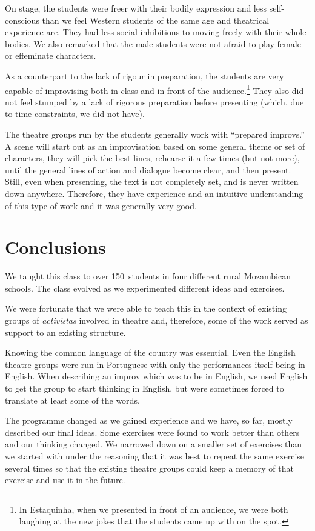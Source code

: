 \documentclass[article,twocolumn,twoside]{memoir}
\begin{document}
On stage, the students were freer with their bodily expression and less
self-conscious than we feel Western students of the same age and theatrical
experience are. They had less social inhibitions to moving freely with their
whole bodies. We also remarked that the male students were not afraid to play
female or effeminate characters.

As a counterpart to the lack of rigour in preparation, the students are very
capable of improvising both in class and in front of the audience.\footnote{In
Estaquinha, when we presented in front of an audience, we were both laughing at
the new jokes that the students came up with on the spot.} They also did not
feel stumped by a lack of rigorous preparation before presenting (which, due to
time constraints, we did not have).

The theatre groups run by the students generally work with ``prepared
improvs.'' A scene will start out as an improvisation based on some general
theme or set of characters, they will pick the best lines, rehearse it a few
times (but not more), until the general lines of action and dialogue become
clear, and then present. Still, even when presenting, the text is not
completely set, and is never written down anywhere. Therefore, they have
experience and an intuitive understanding of this type of work and it was
generally very good.

\chapter{Conclusions}

We taught this class to over 150~students in four different rural Mozambican
schools. The class evolved as we experimented different ideas and exercises.

We were fortunate that we were able to teach this in the context of existing
groups of \textit{activistas} involved in theatre and, therefore, some of the
work served as support to an existing structure.

Knowing the common language of the country was essential. Even the English
theatre groups were run in Portuguese with only the performances itself being
in English. When describing an improv which was to be in English, we used
English to get the group to start thinking in English, but were sometimes
forced to translate at least some of the words.

The programme changed as we gained experience and we have, so far, mostly
described our final ideas. Some exercises were found to work better than others
and our thinking changed. We narrowed down on a smaller set of exercises than
we started with under the reasoning that it was best to repeat the same
exercise several times so that the existing theatre groups could keep a memory
of that exercise and use it in the future.
\end{document}
